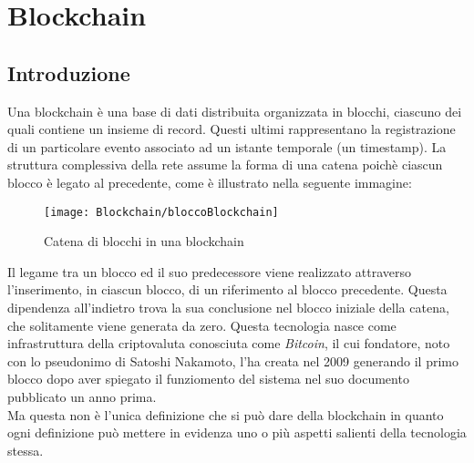 %
%
\chapter{Blockchain}
%
\label{cap:blockchain}
%
\section{Introduzione}
Una blockchain è una base di dati distribuita organizzata in blocchi, ciascuno dei quali contiene un insieme di record. Questi ultimi rappresentano la registrazione di un particolare evento associato ad un istante temporale (un timestamp). La struttura complessiva della rete assume la forma di una catena poichè ciascun blocco è legato al precedente, come è illustrato nella seguente immagine:
\begin{center}%
	\begin{figure}[h!]
		\centering
		\texttt{[image: Blockchain/bloccoBlockchain]}
		\caption{Catena di blocchi in una blockchain}
		\label{fig:catena di blocchi in una blockchain}
	\end{figure}%
\end{center}
Il legame tra un blocco ed il suo predecessore viene realizzato attraverso l'inserimento, in ciascun blocco, di un riferimento al blocco precedente. Questa dipendenza all'indietro trova la sua conclusione nel blocco iniziale della catena, che solitamente viene generata da zero. Questa tecnologia nasce come infrastruttura della criptovaluta conosciuta come \emph{Bitcoin}, il cui fondatore, noto con lo pseudonimo di Satoshi Nakamoto, l'ha creata nel 2009 generando il primo blocco dopo aver spiegato il funziomento del sistema nel suo documento pubblicato un anno prima. \cite{bitcoin} \\
Ma questa non è l'unica definizione che si può dare della blockchain in quanto ogni definizione può mettere  in evidenza uno o più aspetti salienti della tecnologia stessa.
%
